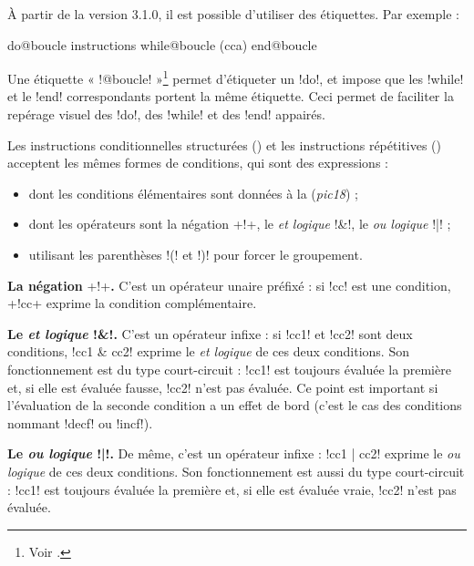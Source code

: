 À partir de la version 3.1.0, il est possible d'utiliser des étiquettes. Par exemple :
\begin{piccolo}
do@boucle
  instructions
while@boucle (cca)
end@boucle
\end{piccolo}

Une étiquette « \pic!@boucle! »\footnote{Voir .} permet d'étiqueter un \pic!do!, et impose que les \pic!while! et le \pic!end! correspondants portent la même étiquette. Ceci permet de faciliter la repérage visuel des \pic!do!, des \pic!while! et des \pic!end! appairés.





Les instructions conditionnelles structurées () et les instructions répétitives () acceptent les mêmes formes de conditions, qui sont des expressions :\begin{itemize}
  \item dont les conditions élémentaires sont données à la  (\emph{pic18}) ;
  \item dont les opérateurs sont la négation \pic+!+, le \emph{et logique} \pic!&!, le \emph{ou logique} \pic!|! ;
  \item utilisant les parenthèses \pic!(! et \pic!)! pour forcer le groupement.
\end{itemize}

\textbf{La négation }\pic+!+\textbf{.} C'est un opérateur unaire préfixé : si \pic!cc! est une condition, \pic+!cc+ exprime la condition complémentaire. %


\textbf{Le \emph{et logique} \pic!&!.} C'est un opérateur infixe : si \pic!cc1! et \pic!cc2! sont deux conditions, \pic!cc1 & cc2! exprime le \emph{et logique} de ces deux conditions. Son fonctionnement est du type court-circuit : \pic!cc1! est toujours évaluée la première et, si elle est évaluée fausse, \pic!cc2! n'est pas évaluée. Ce point est important si l'évaluation de la seconde condition a un effet de bord (c'est le cas des conditions nommant \pic!decf! ou \pic!incf!).

\textbf{Le \emph{ou logique} \pic!|!.} De même, c'est un opérateur infixe : \pic!cc1 | cc2! exprime le \emph{ou logique} de ces deux conditions. Son fonctionnement est aussi du type court-circuit : \pic!cc1! est toujours évaluée la première et, si elle est évaluée vraie, \pic!cc2! n'est pas évaluée.

